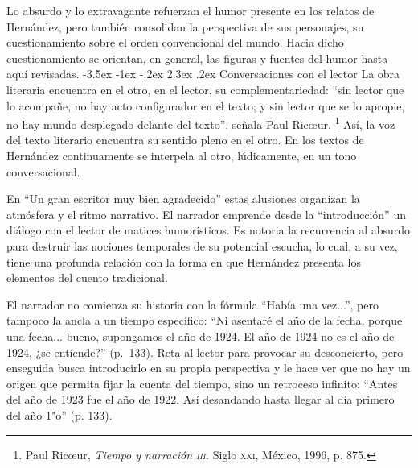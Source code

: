 \documentclass[14pt,twoside,final]{extbook} %
\makeatletter
\let\oldfootnote\footnote
\renewcommand\footnote[1]{%
\oldfootnote{\hspace{1mm}#1}}
\renewcommand\section{\@startsection {section}{1}{\z@}%
                                     {-3.5ex \@plus -1ex \@minus -.2ex}%
                                     {2.3ex \@plus .2ex}%
                                     {\normalfont\large\bfseries\sc}}
\makeatother
\begin{document}
Lo absurdo y lo extravagante refuerzan el humor presente en los relatos de Hernández, pero también consolidan la perspectiva de sus personajes, su cuestionamiento sobre el orden convencional del mundo. Hacia dicho cuestionamiento se orientan, en general, las figuras y fuentes del humor hasta aquí revisadas.
\section{Conversaciones con el lector}\label{sec:conversaciones-con-el-lector}
La obra literaria encuentra en el otro, en el lector, su complementariedad: ``sin lector que lo acompañe, no hay acto configurador en el texto; y sin lector que se lo apropie, no hay mundo desplegado delante del texto'', señala Paul Ric\oe ur.\footnote{Paul Ric\oe ur, \emph{Tiempo y narración \textsc{iii}.} Siglo \textsc{xxi}, México, 1996, p. 875.} Así, la voz del texto literario encuentra su sentido pleno en el otro. En los textos de Hernández continuamente se interpela al otro, lúdicamente, en un tono conversacional.

En ``Un gran escritor muy bien agradecido'' estas alusiones organizan la atmósfera y el ritmo narrativo. El narrador emprende desde la ``introducción'' un diálogo con el lector de matices humorísticos. Es notoria la recurrencia al absurdo para destruir las nociones temporales de su potencial escucha, lo cual, a su vez, tiene una profunda relación con la forma en que Hernández presenta los elementos del cuento tradicional.

El narrador no comienza su historia con la fórmula ``Había una vez...'', pero tampoco la ancla a un tiempo específico: ``Ni asentaré el año de la fecha, porque una fecha... bueno, supongamos el año de 1924. El año de 1924 no es el año de 1924, ¿se entiende?'' (p.~133). Reta al lector para provocar su
desconcierto, pero enseguida busca introducirlo en su propia perspectiva y le hace ver que no hay un origen que permita fijar la cuenta del tiempo, sino un retroceso infinito: ``Antes del año de 1923 fue el año de 1922. Así desandando hasta llegar al día primero del año 1"o'' (p. 133).
\end{document}
